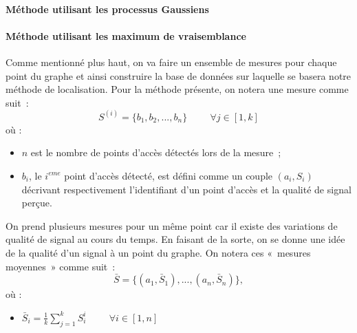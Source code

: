 \documentclass[10pt,journal,compsoc]{IEEEtran}
\begin{document}
	  \paragraph{Méthode utilisant les processus Gaussiens}

	  \paragraph{Méthode utilisant les maximum de vraisemblance}
        Comme mentionné plus haut, on va faire un ensemble de mesures pour chaque point du graphe et ainsi construire la base de données sur laquelle se basera notre
		méthode de localisation. Pour la méthode présente, on notera une mesure comme suit~:
        \begin{equation}
          S^{(i)}=\{b_{1}, b_{2}, ..., b_{n}\} \hspace{1cm} \forall j \in [1, k]  %
        \end{equation}
        où :
        \begin{itemize}
          \item $n$ est le nombre de points d'accès détectés lors de la mesure~;
          \item $b_{i}$, le $i^{eme}$ point d'accès détecté, est défini comme un couple $(a_{i}, S_{i})$ décrivant respectivement l'identifiant d'un point d'accès
		  et la qualité de signal perçue.
        \end{itemize}

        On prend plusieurs mesures pour un même point car il existe des variations de qualité de signal au cours du temps. En faisant de la sorte, on se donne une idée de la qualité d'un signal à un point du graphe. On notera ces «~mesures moyennes~» comme suit~:
        \begin{equation}
          \bar{S} = \{(a_{1}, \bar{S}_{1}), ..., (a_{n}, \bar{S}_{n})\},
        \end{equation}
        où :
        \begin{itemize}
          \item $\bar{S}_{i} = \frac{1}{k}\sum\limits_{j = 1}^{k} S_{i}^{i} \hspace{1cm} \forall i \in [1, n]$
        \end{itemize}
\end{document}
